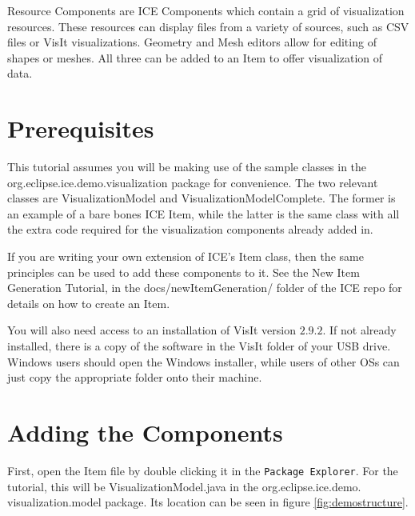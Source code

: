 Resource Components are ICE Components which contain a grid of visualization
resources. These resources can display files from a variety of sources,
such as CSV files or VisIt visualizations. Geometry and Mesh editors allow for
editing of shapes or meshes. All three can be added to an Item to offer
visualization of data.

\section{Prerequisites}

This tutorial assumes you will be making use of the sample classes in the
org.eclipse.ice.demo.visualization package for convenience. The two relevant
classes are VisualizationModel and VisualizationModelComplete. The former is an
example of a bare bones ICE Item, while the latter is the same class with all
the extra code required for the visualization components already added in.

If you are writing your own extension of ICE's Item class, then the same
principles can be used to add these components to it. See the New Item
Generation Tutorial, in the docs/newItemGeneration/ folder of the ICE repo for
details on how to create an Item.

You will also need access to an installation of VisIt version $2.9.2$. If
not already installed, there is a copy of the software in the VisIt folder of
your USB drive. Windows users should open the Windows installer, while users of
other OSs can just copy the appropriate folder onto their machine.

\section{Adding the Components}

First, open the Item file by double clicking it in the \texttt{Package
Explorer}. For the tutorial, this will be VisualizationModel.java in the
org.eclipse.ice.demo. visualization.model package. Its location can be seen in
figure \ref{fig:demostructure}.

